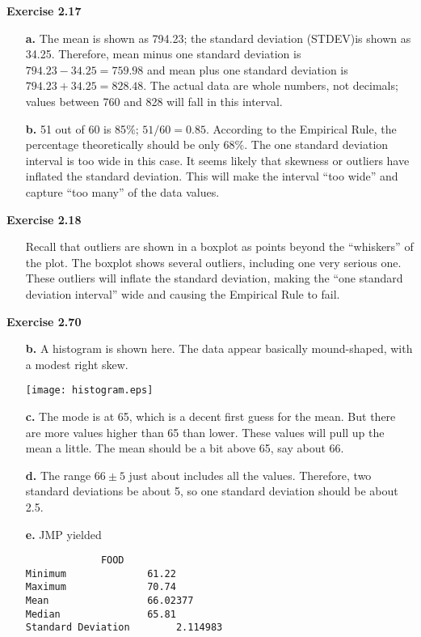 \documentclass[10pt]{article}
\begin{document}
{\bf Exercise 2.17}
\begin{itemize}
\item[\bf a.] The mean is shown as 794.23; the standard 
deviation (STDEV)is shown as 34.25. Therefore, mean minus one standard 
deviation is $794.23-34.25=759.98$ and mean plus one standard deviation 
is $794.23+34.25=828.48$.  The actual data are whole numbers, not 
decimals; values between 760 and 828 will fall in this interval.
\item[\bf b.] 51 out of 60 is 85$\%$; $51/60=0.85$. According to the 
Empirical Rule, the percentage theoretically should be only $68\%$. 
The one standard deviation interval is too wide in this case. It seems 
likely that skewness or outliers have inflated the standard deviation. 
This will make the interval ``too wide'' and capture ``too many'' of 
the data values.
\end{itemize}

{\bf Exercise 2.18}
\begin{itemize}
\item[\empty] Recall that outliers are shown in a boxplot as points 
beyond the ``whiskers'' of the plot. The boxplot shows several 
outliers, including one very serious one. These outliers will inflate 
the standard deviation, making the ``one standard deviation interval'' 
wide and causing the Empirical Rule to fail.
\end{itemize}

{\bf Exercise 2.70}
\begin{itemize}
\item[\bf b.] A histogram is shown here. The data 
appear basically mound-shaped, with a modest right skew.

\centerline{\texttt{[image: histogram.eps]}}

\item[\bf c.] The mode is at 65, which is a decent first guess for 
the mean. But there are more values higher than 65 than lower. These 
values will pull up the mean a little. The mean should be a bit above 
65, say about 66.
\item[\bf d.] The range $66\pm 5$ just about includes all the values. 
Therefore, two standard deviations be about 5, so one standard 
deviation should be about 2.5.
\item[\bf e.] JMP yielded 
\begin{verbatim}
             FOOD
Minimum              61.22
Maximum              70.74
Mean                 66.02377 
Median               65.81
Standard Deviation        2.114983                
\end{verbatim}                     
\end{itemize}
\end{document}
